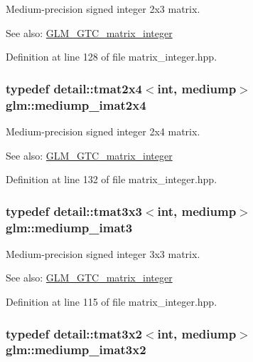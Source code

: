 Medium-precision signed integer 2x3 matrix. \begin{Desc}
\item[See also:]\hyperlink{group__gtc__matrix__integer}{GLM\_\-GTC\_\-matrix\_\-integer} \end{Desc}


Definition at line 128 of file matrix\_\-integer.hpp.\hypertarget{group__gtc__matrix__integer_g90b020de8489a1d4424c0ffcc17c83dd}{
\subsubsection[mediump\_\-imat2x4]{\setlength{\rightskip}{0pt plus 5cm}typedef detail::tmat2x4$<$int, mediump$>$ {\bf glm::mediump\_\-imat2x4}}}
\label{group__gtc__matrix__integer_g90b020de8489a1d4424c0ffcc17c83dd}


Medium-precision signed integer 2x4 matrix. \begin{Desc}
\item[See also:]\hyperlink{group__gtc__matrix__integer}{GLM\_\-GTC\_\-matrix\_\-integer} \end{Desc}


Definition at line 132 of file matrix\_\-integer.hpp.\hypertarget{group__gtc__matrix__integer_g6b438ab863af0122b532adc93b89105e}{
\subsubsection[mediump\_\-imat3]{\setlength{\rightskip}{0pt plus 5cm}typedef detail::tmat3x3$<$int, mediump$>$ {\bf glm::mediump\_\-imat3}}}
\label{group__gtc__matrix__integer_g6b438ab863af0122b532adc93b89105e}


Medium-precision signed integer 3x3 matrix. \begin{Desc}
\item[See also:]\hyperlink{group__gtc__matrix__integer}{GLM\_\-GTC\_\-matrix\_\-integer} \end{Desc}


Definition at line 115 of file matrix\_\-integer.hpp.\hypertarget{group__gtc__matrix__integer_g2a90775c74656b8a825f24d510f0ea5d}{
\subsubsection[mediump\_\-imat3x2]{\setlength{\rightskip}{0pt plus 5cm}typedef detail::tmat3x2$<$int, mediump$>$ {\bf glm::mediump\_\-imat3x2}}}
\label{group__gtc__matrix__integer_g2a90775c74656b8a825f24d510f0ea5d}


